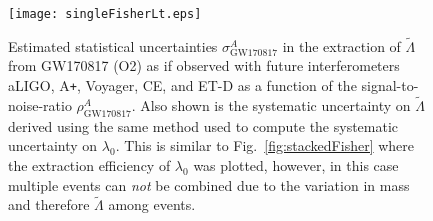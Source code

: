 \documentclass[prd,twocolumn,nofootinbib,superscriptaddress,amsmath,amssymb]{revtex4-1}
\begin{document}
\begin{figure}
\begin{center} 
\texttt{[image: singleFisherLt.eps]}
\end{center}
\caption{
Estimated statistical uncertainties $\sigma^A_{\text{GW170817}}$ in the extraction of $\tilde\Lambda$ from GW170817 (O2) as if observed with future interferometers aLIGO, A\texttt{+}, Voyager, CE, and ET-D as a function of the signal-to-noise-ratio $\rho^A_{\text{GW170817}}$.
Also shown is the systematic uncertainty on $\tilde\Lambda$ derived using the same method used to compute the systematic uncertainty on $\lambda_0$.
This is similar to Fig.~\ref{fig:stackedFisher} where the extraction efficiency of $\lambda_0$ was plotted, however, in this case multiple events can \emph{not} be combined due to the variation in mass and therefore $\tilde\Lambda$ among events.
}
\label{fig:singleFisherLt}
\end{figure} 
\end{document}
